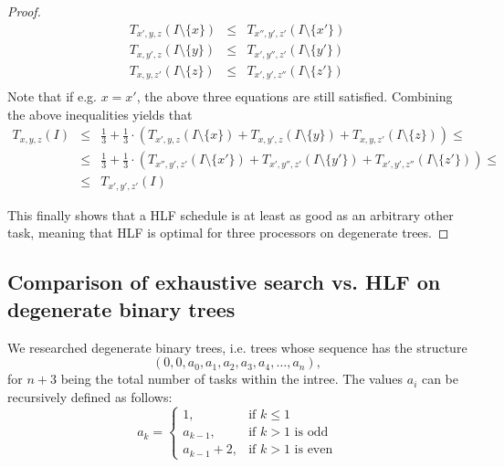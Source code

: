 \begin{proof}
  \begin{eqnarray*}
    T_{x',y,z}(I\setminus\{x\})
    & \leq &
    T_{x'',y',z'}(I\setminus\{x'\}) \\
    T_{x,y',z}(I\setminus\{y\})
    & \leq &
    T_{x',y'',z'}(I\setminus\{y'\}) \\
    T_{x,y,z'}(I\setminus\{z\})
    & \leq &
    T_{x',y',z''}(I\setminus\{z'\}) \\
  \end{eqnarray*}
  Note that if e.g. $x=x'$, the above three equations are still satisfied.
  Combining the above inequalities yields that
  \begin{eqnarray*}
    T_{x,y,z}(I) 
    & \leq & 
    \frac{1}{3} + \frac{1}{3} \cdot 
    \left( 
      T_{x',y,z}(I\setminus\{x\}) +
      T_{x,y',z}(I\setminus\{y\}) +
      T_{x,y,z'}(I\setminus\{z\})
    \right) 
    \leq \\
    & \leq &
    \frac{1}{3} + \frac{1}{3} \cdot 
    \left( 
      T_{x'',y',z'}(I\setminus\{x'\}) +
      T_{x',y'',z'}(I\setminus\{y'\}) +
      T_{x',y',z''}(I\setminus\{z'\})
    \right) \leq \\
    & \leq &
    T_{x',y',z'}(I)
  \end{eqnarray*}

  This finally shows that a HLF schedule is at least as good as an arbitrary other task, meaning that HLF is optimal for three processors on degenerate trees.
\end{proof}

\subsection{Comparison of exhaustive search vs. HLF on degenerate binary trees}
\label{sec:p3-degenerate-trees-binary}

We researched degenerate binary trees, i.e. trees whose sequence has the structure
\begin{equation*}
  \left( 0,0,a_0,a_1,a_2,a_3,a_4,\dots,a_n \right),
\end{equation*}
for $n+3$ being the total number of tasks within the intree. The values $a_i$ can be recursively defined as follows:
\begin{equation*}
  a_k =
  \begin{cases}
    1, & \text{if } k\leq 1 \\
    a_{k-1}, & \text{if } k>1 \text{ is odd} \\
    a_{k-1}+2, & \text{if } k>1 \text{ is even}
  \end{cases}
\end{equation*}

